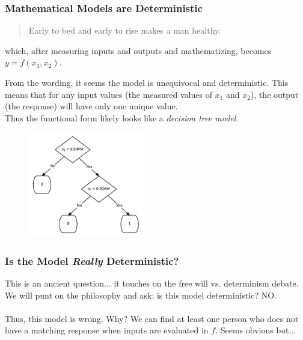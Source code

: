 \documentclass[handout]{beamer}
\begin{document}
\begin{frame}\frametitle{Mathematical Models are Deterministic}

\small
\begin{quotation}
Early to bed and early to rise makes a man healthy.
\end{quotation}

which, after measuring inputs and outputs and mathematizing, becomes $y = f(x_1, x_2)$.\\

\begin{minipage}{0.4\textwidth}
\footnotesize
From the wording, it seems the model is unequivocal and deterministic. This means \pause that for any input values (the measured values of $x_1$ and $x_2$), the output (the response) will have only one unique value.\\
\vspace{0.2cm}
Thus the functional form likely looks like a \textit{decision tree model}.
\end{minipage}%
\begin{minipage}{0.6\textwidth}
\begin{figure}
\centering
\includegraphics[width=2in]{simple_health}
\end{figure}
\end{minipage}
	
\end{frame}

\begin{frame}\frametitle{Is the Model \textit{Really} Deterministic?}

This is an ancient question... it touches on the free will vs. determinism debate. We will punt on the philosophy and ask: is this model deterministic? \pause NO. \\~\\

Thus, this model is wrong. Why? We can find at least one person who does not have a matching response when inputs are evaluated in $f$. Seems obvious but...

\end{frame}
\end{document}
